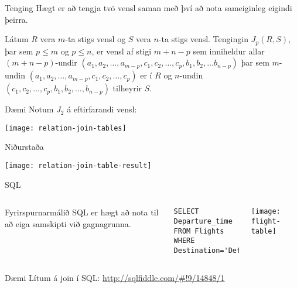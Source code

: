 \documentclass{beamer}
\begin{document}
\begin{frame}{Tenging}
Hægt er að tengja tvö vensl saman með því að nota sameiginleg eigindi þeirra.

\begin{tcolorbox}[title=Tenging]
Látum $R$ vera $m$-ta stigs vensl og $S$ vera $n$-ta stigs vensl. Tengingin $J_p(R,S)$, þar sem $p\leq m$ og $p \leq n$, er vensl af stigi $m+n-p$ sem inniheldur allar $(m+n-p)$-undir $(a_1, a_2, \ldots, a_{m-p}, c_1, c_2, \ldots, c_p, b_1, b_2, \ldots b_{n-p})$ þar sem $m$-undin $(a_1 , a_2 , \ldots , a_{m-p} , c_1 , c_2 , \ldots , c_p )$ er í $R$ og $n$-undin $(c_1 , c_2 , \ldots , c_p , b_1 , b_2 , \ldots , b_{n-p} )$ tilheyrir $S$.
\end{tcolorbox}

\end{frame}

\begin{frame}{Dæmi}
Notum $J_2$ á eftirfarandi vensl:
\begin{center}
\texttt{[image: relation-join-tables]}
\end{center}
\end{frame}
\begin{frame}{Niðurstaða}
\begin{center}
\texttt{[image: relation-join-table-result]}
\end{center}
\end{frame}

\begin{frame}[fragile]{SQL}
\begin{columns}
Fyrirspurnarmálið SQL er hægt að nota til að eiga samskipti við gagnagrunna.
\vspace{0.5cm}
\begin{verbatim}
SELECT Departure_time
FROM Flights
WHERE Destination='Detroit';
\end{verbatim}

\begin{center}
\texttt{[image: flight-table]}
\vspace{1cm}
\end{center}
\end{columns}
\end{frame}

\begin{frame}{Dæmi}
Lítum á join í SQL: \url{http://sqlfiddle.com/\#!9/14848/1}
\end{frame}
\end{document}
